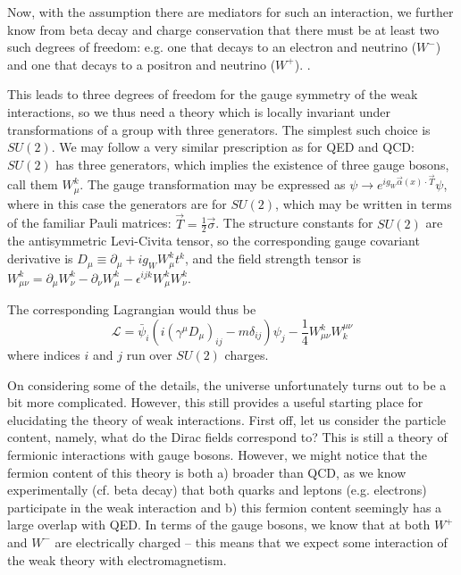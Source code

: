 Now, with the assumption there are mediators for such an interaction, we further know from beta decay and 
charge conservation that there must be at least two such degrees of freedom: e.g. one that decays to an electron 
and neutrino ($W^{-}$) and one that decays to a positron and neutrino ($W^{+}$). .

This leads to three degrees of freedom for the gauge symmetry of the weak interactions, so we thus need a theory 
which is locally invariant under transformations of a group with three generators. The simplest such choice is $SU(2)$. 
We may follow a very similar prescription as for QED and QCD: $SU(2)$ has three generators, which implies the existence of 
three gauge bosons, call them $W_{\mu}^k$.  The gauge transformation may be expressed as $\psi \rightarrow e^{ig_{W}\vec{\alpha}(x)\cdot \vec{T}}\psi$, where in this case the generators are for $SU(2)$, which may be written in terms of the familiar
Pauli matrices: $\vec{T} = \frac{1}{2}\vec{\sigma}$. The structure constants for $SU(2)$ are the antisymmetric Levi-Civita 
tensor, so the corresponding gauge covariant derivative is
$D_{\mu} \equiv \partial_{\mu} + ig_{W}W_{\mu}^{k}t^{k}$, and the field strength tensor is 
$W_{\mu\nu}^{k} = \partial_{\mu}W_{\nu}^{k}-\partial_{\nu}W_{\mu}^{k}-\epsilon^{ijk}W_{\mu}^{k}W_{\nu}^{k}$.

The corresponding Lagrangian would thus be
\begin{equation}
\mathcal{L} = \bar{\psi}_{i}(i(\gamma^{\mu}D_{\mu})_{ij} - m\delta_{ij})\psi_{j} -\frac{1}{4} W_{\mu\nu}^{k}W^{\mu\nu}_{k}
\end{equation}
where indices $i$ and $j$ run over $SU(2)$ charges.

On considering some of the details, the universe unfortunately turns out to be a bit more complicated. However, this still
provides a useful starting place for elucidating the theory of weak interactions. First off, let us consider the 
particle content, namely, what do the Dirac fields correspond to? This is still a theory of fermionic interactions
with gauge bosons. However, we might notice that the fermion content of this theory is both a) broader than QCD, 
as we know experimentally (cf. beta decay) that both quarks and leptons (e.g. electrons) participate in the 
weak interaction and b) this fermion content seemingly has a large overlap with QED. In terms of the gauge bosons, 
we know that at both $W^{+}$ and $W^{-}$ are electrically charged -- this means that we expect some interaction of 
the weak theory with electromagnetism. 

